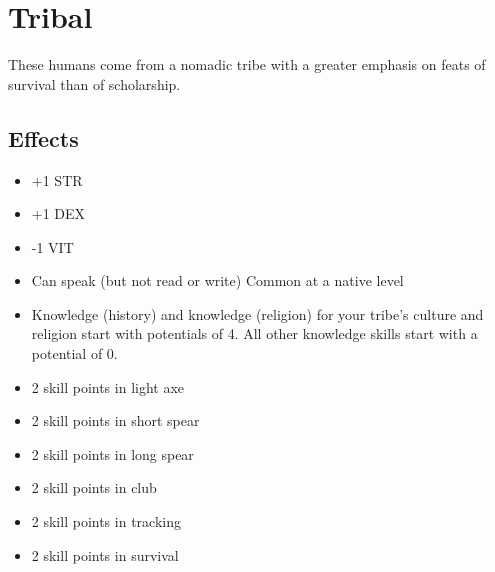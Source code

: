 \section{Tribal}\label{culture:tribal}
These humans come from a nomadic tribe with a greater emphasis on feats of
survival than of scholarship.

\subsection*{Effects}
\begin{itemize}
    \item +1 STR
    \item +1 DEX
    \item -1 VIT
    \item Can speak (but not read or write) Common at a native level
    \item Knowledge (history) and knowledge (religion) for your tribe's culture
        and religion start with potentials of 4. All other knowledge skills
        start with a potential of 0.
    \item 2 skill points in light axe
    \item 2 skill points in short spear
    \item 2 skill points in long spear
    \item 2 skill points in club
    \item 2 skill points in tracking
    \item 2 skill points in survival
\end{itemize}
